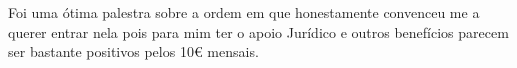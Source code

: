 \myemptypage{}
\rhead{\thechapter}


Foi uma ótima palestra sobre a ordem em que honestamente convenceu me a querer entrar nela pois para mim ter o apoio Jurídico e outros benefícios parecem ser bastante positivos pelos 10€ mensais.